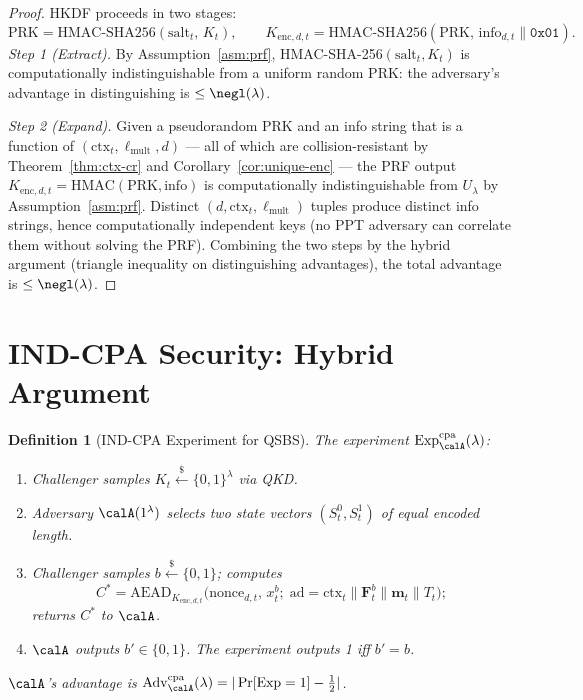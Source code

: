 \documentclass[11pt,letterpaper]{article}
\newtheorem{definition}{Definition}[section]
\begin{document}
\begin{proof}
HKDF proceeds in two stages:
\[
  \mathrm{PRK} = \mathrm{HMAC\text{-}SHA256}(\mathrm{salt}_t,\, K_t),
  \qquad
  K_{\mathrm{enc},d,t} = \mathrm{HMAC\text{-}SHA256}(\mathrm{PRK},\,
    \mathrm{info}_{d,t} \| \mathtt{0x01}).
\]
\textit{Step 1 (Extract).}
By Assumption~\ref{asm:prf}, HMAC-SHA-256$(\mathrm{salt}_t, K_t)$ is
computationally indistinguishable from a uniform random $\mathrm{PRK}$:
the adversary's advantage in distinguishing is $\leq \negl(\lambda)$.

\textit{Step 2 (Expand).}
Given a pseudorandom PRK and an info string that is a function of
$(\mathrm{ctx}_t, \ell_{\mathrm{mult}}, d)$ --- all of which are
collision-resistant by Theorem~\ref{thm:ctx-cr} and
Corollary~\ref{cor:unique-enc} --- the PRF output
$K_{\mathrm{enc},d,t} = \mathrm{HMAC}(\mathrm{PRK}, \mathrm{info})$
is computationally indistinguishable from $U_\lambda$
by Assumption~\ref{asm:prf}.
Distinct $(d, \mathrm{ctx}_t, \ell_{\mathrm{mult}})$ tuples produce distinct
info strings, hence computationally independent keys (no PPT adversary can
correlate them without solving the PRF).
Combining the two steps by the hybrid argument (triangle inequality on
distinguishing advantages), the total advantage is $\leq \negl(\lambda)$.
\end{proof}

\section{IND-CPA Security: Hybrid Argument}
\label{sec:security}

\begin{definition}[IND-CPA Experiment for QSBS]\label{def:indcpa}
The experiment $\mathrm{Exp}^{\mathrm{cpa}}_\calA(\lambda)$:
\begin{enumerate}[leftmargin=*,noitemsep]
  \item Challenger samples $K_t \xleftarrow{\$}\{0,1\}^\lambda$ via QKD.
  \item Adversary $\calA(1^\lambda)$ selects two state vectors
        $(S^0_t, S^1_t)$ of equal encoded length.
  \item Challenger samples $b \xleftarrow{\$}\{0,1\}$; computes
        \[C^* = \mathrm{AEAD}_{K_{\mathrm{enc},d,t}}\!\bigl(
            \mathrm{nonce}_{d,t},\, x^b_t;\;
            \mathrm{ad} = \mathrm{ctx}_t \| \mathbf{F}^b_t \| \mathbf{m}_t \| T_t
          \bigr);\]
        returns $C^*$ to $\calA$.
  \item $\calA$ outputs $b'\in\{0,1\}$.
        The experiment outputs 1 iff $b' = b$.
\end{enumerate}
$\calA$'s advantage is $\mathrm{Adv}^\mathrm{cpa}_\calA(\lambda)
  = |\Pr[\mathrm{Exp}=1] - \tfrac{1}{2}|$.
\end{definition}
\end{document}
